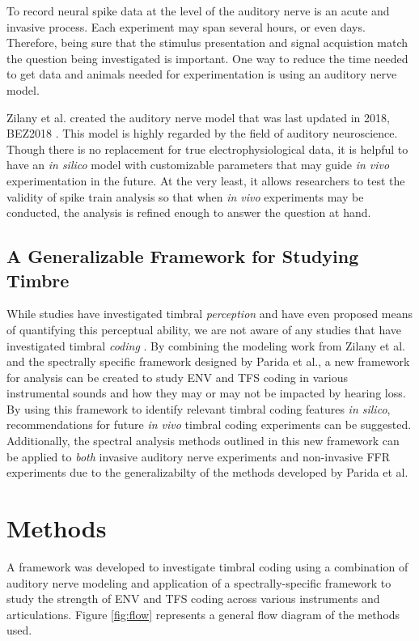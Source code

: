 \documentclass[conference]{IEEEtran}
\begin{document}
To record neural spike data at the level of the auditory nerve is an acute and invasive process. Each experiment may span several hours, or even days.  Therefore, being sure that the stimulus presentation and signal acquistion match the question being investigated is important. One way to reduce the time needed to get data and animals needed for experimentation is using an auditory nerve model.

Zilany et al. created the auditory nerve model that was last updated in 2018, BEZ2018 \cite{bruce_phenomenological_2018}. This model is highly regarded by the field of auditory neuroscience. Though there is no replacement for true electrophysiological data, it is helpful to have an \textit{in silico} model with customizable parameters that may guide \textit{in vivo} experimentation in the future. At the very least, it allows researchers to test the validity of spike train analysis so that when \textit{in vivo} experiments may be conducted, the analysis is refined enough to answer the question at hand.
 
\subsection{A Generalizable Framework for Studying Timbre} 
 
While studies have investigated timbral \textit{perception} and have even proposed means of quantifying this perceptual ability, we are not aware of any studies that have investigated timbral \textit{coding} \cite{lee_timbre_2020}. By combining the modeling work from Zilany et al. and the spectrally specific framework designed by Parida et al., a new framework for analysis can be created to study ENV and TFS coding in various instrumental sounds and how they may or may not be impacted by hearing loss. By using this framework to identify relevant timbral coding features \textit{in silico}, recommendations for future \textit{in vivo} timbral coding experiments can be suggested. Additionally, the spectral analysis methods outlined in this new framework can be applied to \textit{both} invasive auditory nerve experiments and non-invasive FFR experiments due to the generalizabilty of the methods developed by Parida et al.
 
\section{Methods}

A framework was developed to investigate timbral coding using a combination of auditory nerve modeling and application of a spectrally-specific framework to study the strength of ENV and TFS coding across various instruments and articulations. Figure \ref{fig:flow} represents a general flow diagram of the methods used.
\end{document}
